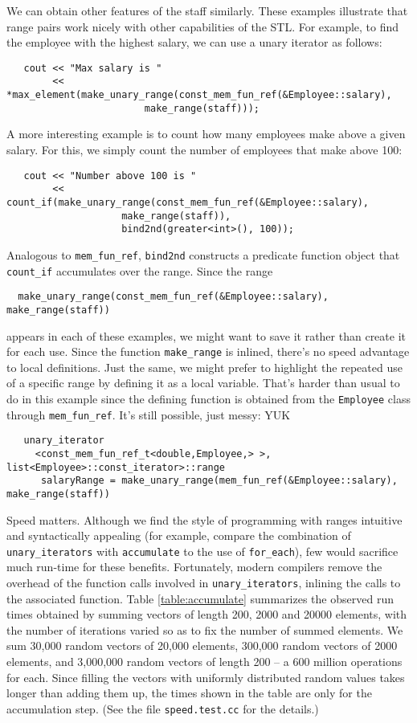 \documentclass[12pt]{article}
\begin{document}
We can obtain other features of the staff similarly.  These examples
illustrate that range pairs work nicely with other capabilities of the
STL. For example, to find the employee with the highest salary, we can
use a unary iterator as follows:
\begin{verbatim}
   cout << "Max salary is "
        << *max_element(make_unary_range(const_mem_fun_ref(&Employee::salary), 
                        make_range(staff)));
\end{verbatim}
A more interesting example is to count how many employees make above a
given salary.  For this, we simply count the number of employees that
make above 100:
\begin{verbatim}
   cout << "Number above 100 is "
        << count_if(make_unary_range(const_mem_fun_ref(&Employee::salary), 
                    make_range(staff)),
                    bind2nd(greater<int>(), 100));
\end{verbatim}
Analogous to {\tt mem\_fun\_ref}, {\tt bind2nd} constructs a predicate
function object that {\tt count\_if} accumulates over the range.
Since the range 
\begin{verbatim}
  make_unary_range(const_mem_fun_ref(&Employee::salary), make_range(staff))
\end{verbatim}
appears in each of these examples, we might want to save it rather
than create it for each use.  Since the function {\tt make\_range} is
inlined, there's no speed advantage to local definitions.  Just the
same, we might prefer to highlight the repeated use of a specific
range by defining it as a local variable.  That's harder than usual to
do in this example since the defining function is obtained from the
{\tt Employee} class through {\tt mem\_fun\_ref}.  It's still
possible, just messy:  YUK
\begin{verbatim}
   unary_iterator
     <const_mem_fun_ref_t<double,Employee,> >, list<Employee>::const_iterator>::range 
      salaryRange = make_unary_range(mem_fun_ref(&Employee::salary), make_range(staff))
\end{verbatim}


  Speed matters.  Although we find the style of programming with
ranges intuitive and syntactically appealing (for example, compare the
combination of {\tt unary\_iterators} with {\tt accumulate} to the use
of {\tt for\_each}), few would sacrifice much run-time for these
benefits.  Fortunately, modern compilers remove the overhead of the
function calls involved in {\tt unary\_iterators}, inlining the calls
to the associated function.  Table \ref{table:accumulate} summarizes
the observed run times obtained by summing vectors of length 200, 2000
and 20000 elements, with the number of iterations varied so as to fix
the number of summed elements.  We sum 30,000 random vectors of 20,000
elements, 300,000 random vectors of 2000 elements, and 3,000,000
random vectors of length 200 -- a 600 million operations for each.
Since filling the vectors with uniformly distributed random values
takes longer than adding them up, the times shown in the table are
only for the accumulation step.  (See the file {\tt speed.test.cc} for
the details.)
\end{document}
